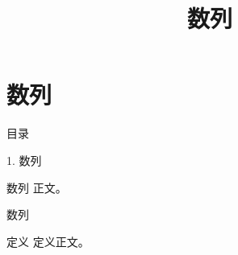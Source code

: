 \documentclass[aspectratio=169,10pt,fontset=fandol]{ctexbeamer}
\title{数列}
\begin{document}
\section{数列}
\begin{frame}[t,fragile]{目录}
\normalsize
{\color{blue}\normalsize 1. 数列\par}\vspace{0.3em}
\end{frame}
\begin{frame}[t,fragile]{数列}
\normalsize
{\normalsize
正文。
}
\end{frame}
\begin{frame}[t,fragile]{数列}
\normalsize
\begin{block}{定义}
{\normalsize
定义正文。
}
\end{block}
\end{frame}
\end{document}

